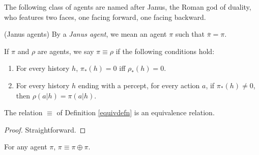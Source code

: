 \documentclass[runningheads]{llncs}
\begin{document}
The following class of agents are named after Janus, the Roman god of duality,
who features two faces, one facing forward, one facing backward.

\begin{definition}
    (Janus agents)
    By a \emph{Janus agent}, we mean an agent $\pi$ such that
    $\overline{\pi}=\pi$.
\end{definition}

\begin{definition}
\label{equivdefn}
    If $\pi$ and $\rho$ are agents, we say $\pi\equiv\rho$ if the
    following conditions hold:
    \begin{enumerate}
        \item For every history $h$, $\pi_*(h)=0$ iff $\rho_*(h)=0$.
        \item For every history $h$ ending with a percept,
            for every action $a$, if $\pi_*(h)\not=0$,
            then $\rho(a|h)=\pi(a|h)$.
    \end{enumerate}
\end{definition}

\begin{lemma}
\label{equivrelationlemma}
    The relation $\equiv$ of Definition \ref{equivdefn} is an equivalence
    relation.
\end{lemma}

\begin{proof}
    Straightforward.
\end{proof}

\begin{lemma}
\label{piopluspilemma}
    For any agent $\pi$, $\pi\equiv\pi\oplus\pi$.
\end{lemma}
\end{document}
